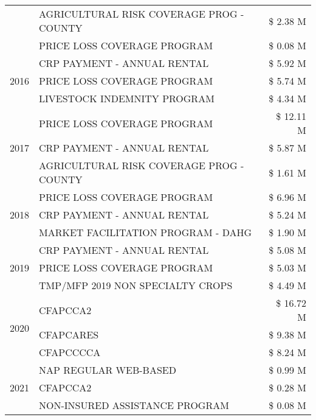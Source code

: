 \begin{tabular}{llr}
 & AGRICULTURAL RISK COVERAGE PROG - COUNTY & \$ 2.38 M \\
 & PRICE LOSS COVERAGE PROGRAM & \$ 0.08 M \\
\cline{1-3}
\multirow[t]{3}{*}{2016} & CRP PAYMENT - ANNUAL RENTAL & \$ 5.92 M \\
 & PRICE LOSS COVERAGE PROGRAM & \$ 5.74 M \\
 & LIVESTOCK INDEMNITY PROGRAM & \$ 4.34 M \\
\cline{1-3}
\multirow[t]{3}{*}{2017} & PRICE LOSS COVERAGE PROGRAM & \$ 12.11 M \\
 & CRP PAYMENT - ANNUAL RENTAL & \$ 5.87 M \\
 & AGRICULTURAL RISK COVERAGE PROG - COUNTY & \$ 1.61 M \\
\cline{1-3}
\multirow[t]{3}{*}{2018} & PRICE LOSS COVERAGE PROGRAM & \$ 6.96 M \\
 & CRP PAYMENT - ANNUAL RENTAL & \$ 5.24 M \\
 & MARKET FACILITATION PROGRAM - DAHG & \$ 1.90 M \\
\cline{1-3}
\multirow[t]{3}{*}{2019} & CRP PAYMENT - ANNUAL RENTAL & \$ 5.08 M \\
 & PRICE LOSS COVERAGE PROGRAM & \$ 5.03 M \\
 & TMP/MFP 2019 NON SPECIALTY CROPS & \$ 4.49 M \\
\cline{1-3}
\multirow[t]{3}{*}{2020} & CFAPCCA2 & \$ 16.72 M \\
 & CFAPCARES & \$ 9.38 M \\
 & CFAPCCCCA & \$ 8.24 M \\
\cline{1-3}
\multirow[t]{3}{*}{2021} & NAP REGULAR WEB-BASED & \$ 0.99 M \\
 & CFAPCCA2 & \$ 0.28 M \\
 & NON-INSURED ASSISTANCE PROGRAM & \$ 0.08 M \\
\cline{1-3}
\bottomrule
\end{tabular}
